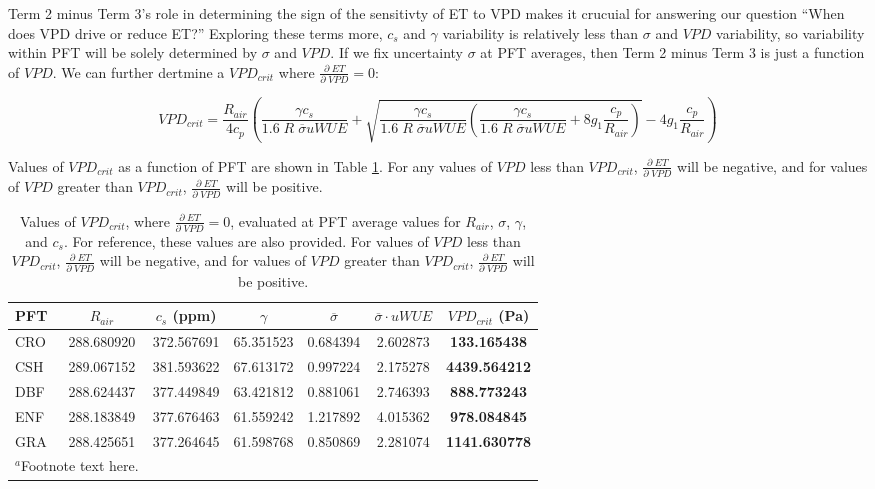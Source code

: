 \documentclass[draft,linenumbers]{agujournal}
\begin{document}
Term 2 minus Term 3's role in determining the sign of the sensitivty of ET to VPD makes it crucuial for answering our question ``When does VPD drive or reduce ET?'' Exploring these terms more, $c_s$ and $\gamma$ variability is relatively less than $\sigma$ and $VPD$ variability, so variability within PFT will be solely determined by $\sigma$ and $VPD$. If we fix uncertainty $\sigma$ at PFT averages, then Term 2 minus Term 3 is just a function of $VPD$. We can further dertmine a $VPD_{crit}$ where $\frac{\partial \; ET}{\partial \; VPD} = 0$:

\begin{linenomath*}
  \begin{equation}
VPD_{crit} = \frac{R_{air}}{4 c_p} \left( \frac{\gamma c_s}{1.6\; R \; \overline{\sigma} uWUE} + \sqrt{\frac{\gamma c_s}{1.6\; R \; \overline{\sigma} uWUE}\left( \frac{\gamma c_s}{1.6\; R \; \overline{\sigma} uWUE} + 8 g_1 \frac{c_p}{R_{air}}\right)} - 4 g_1 \frac{c_p}{R_{air}} \right)
\label{vpd_min_et}
  \end{equation}
\end{linenomath*}

Values of $VPD_{crit}$ as a function of PFT are shown in Table \ref{vpd_crit}. For any values of $VPD$ less than $VPD_{crit}$, $\frac{\partial \; ET}{\partial \; VPD}$ will be negative, and for values of $VPD$ greater than $VPD_{crit}$, $\frac{\partial \; ET}{\partial \; VPD}$ will be positive.


\begin{table}
  \label{vpd_crit}
\caption{Values of $VPD_{crit}$, where $\frac{\partial \; ET}{\partial \; VPD} = 0$, evaluated at PFT average values for $R_{air}$, $\sigma$, $\gamma$, and $c_s$. For reference, these values are also provided. For values of $VPD$ less than $VPD_{crit}$, $\frac{\partial \; ET}{\partial \; VPD}$ will be negative, and for values of $VPD$ greater than $VPD_{crit}$, $\frac{\partial \; ET}{\partial \; VPD}$ will be positive.}
\centering
\begin{tabular}{l c c c c c c}
  \hline
  PFT & $R_{air}$ & $c_s$ (ppm) & $\gamma$ & $\overline{\sigma}$ & $\overline{\sigma} \cdot uWUE$ & \textbf{$VPD_{crit}$ (Pa)} \\
  \hline
  CRO &  288.680920 & 372.567691& 65.351523& 0.684394&       2.602873&  \textbf{133.165438} \\
  CSH &   289.067152& 381.593622& 67.613172& 0.997224&       2.175278& \textbf{4439.564212} \\
  DBF &   288.624437& 377.449849& 63.421812& 0.881061&       2.746393&  \textbf{888.773243} \\
  ENF &  288.183849& 377.676463& 61.559242& 1.217892&       4.015362&  \textbf{978.084845} \\
  GRA &  288.425651& 377.264645& 61.598768& 0.850869&       2.281074& \textbf{1141.630778} \\
\hline
\multicolumn{2}{l}{$^{a}$Footnote text here.}
\end{tabular}
\end{table}
\end{document}
